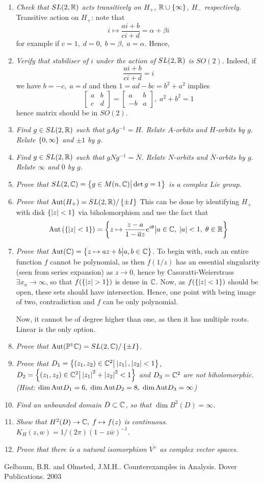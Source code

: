\documentclass[10pt]{article} %
\newcommand{\Aut}{\mbox{\normalfont{Aut}}}
\begin{document}
\begin{enumerate}[1. ]
\item\textit{Check that $SL(2,\mathbb{R})$ acts transitively on $H_+$, $\mathbb{R}\cup\left\{\infty\right\}$, $H_-$ respectively.}
Transitive action on $H_+$: note that
\[i\mapsto \frac{ai+b}{ci+d}=\alpha+\beta i\]
for example if $c=1,\;d=0,\;b=\beta,\;a=\alpha$. Hence, 
\item\textit{Verify that stabiliser of $i$ under the action of $SL(2,\mathbb{R})$ is $SO(2)$.}
Indeed, if
\[\frac{ai+b}{ci+d}=i\]
we have $b=-c,\;a=d$ and then $1=ad-bc=b^2+a^2$ implies
\[\begin{bmatrix}a&b\\c&d\end{bmatrix}=\begin{bmatrix}a&b\\-b&a\end{bmatrix},\;a^2+b^2=1\]
hence matrix should be in $SO(2)$.
\item\textit{Find $g\in SL(2,\mathbb{R})$ such that $gAg^{-1}=H$. Relate $A$-orbits and $H$-orbits by $g$. Relate $\left\{0,\infty\right\}$ and ${\pm1}$ by $g$.}
\item\textit{Find $g\in SL(2,\mathbb{R})$ such that $gNg^{-1}=\overline{N}$.
 Relate $N$-orbits and $\overline{N}$-orbits by $g$. Relate ${\infty}$ and $0$ by $g$.}
\item\textit{Prove that $SL(2,\mathbb{C})=\left\{g\in M(n,\mathbb{C})\big| \det g=1\right\}$ is a complex Lie group.}
\item\textit{Prove that $\Aut(H_+)=SL(2,\R)/\mycbra{\pm I}$}
This can be done by identifying $H_+$ with disk $\left\{\left|z\right|<1\right\}$ via biholomorphism and use the fact that
\[\Aut\mybra{\mycbra{\myabs{z}<1}}=\mysetn{z\mapsto\frac{z-a}{1-\overline{a}z}e^{i\theta}}{a\in\C,\;\myabs{a}<1,\;\theta\in\mathbb{R}}\]
\item\textit{Prove that $\Aut(\C)=\mysetn{z\mapsto az+b}{a,b\in\C}$.}
To begin with, such an entire function $f$ cannot be polynomial, as then $f(1/z)$ has an essential singularity (seen from
series expansion) as $z\to0$, hence
by Casoratti-Weierstrass $\exists x_n\to\infty$, so that $f(\mycbra{\myabs{z}>1})$ is dense in $\mathbb{C}$. Now, as $f(\left\{\left|z\right|<1\right\})$
should be open, these sets should have intersection. Hence, one point with being image of two, contradiction and $f$ can be only polynomial.

Now, it cannot be of degree higher than one, as then it has multiple roots. Linear is the only option.
\item\textit{Prove that $\Aut(\mathbb{P}^1\C)=SL(2,\C)/\mycbra{\pm I}$.}
\item\textit{Prove that $D_1=\left\{(z_1,z_2)\in\mathbb{C}^2\big| \left|z_1\right|,\left|z_2\right|<1\right\}$, $D_2=\left\{(z_1,z_2)\in\mathbb{C}^2\big| \left|z_1\right|^2+\left|z_2\right|^2<1\right\}$
and $D_3=\mathbb{C}^2$ are not biholomorphic. (Hint: $\dim\Aut D_1=6,\;\dim\Aut D_2=8,\;\dim\Aut D_3=\infty$)}%
\item\textit{Find an unbounded domain $D\subset\mathbb{C}$, so that $\dim B^2(D)=\infty$.}
\item\textit{Show that $H^2(D)\to\mathbb{C},\;f\mapsto f(z)$ is continuous. $K_H(z,w)=1/(2\pi)(1-z\overline{w})^{-1}$.}
\item\textit{Prove that there is a natural isomorphism $\overline{V^\vee}$ as complex vector spaces.}
\end{enumerate}
\begin{thebibliography}{9}
Gelbaum, B.R. and Olmsted, J.M.H.. Counterexamples in Analysis. Dover Publications. 2003
\end{thebibliography}
\end{document}
